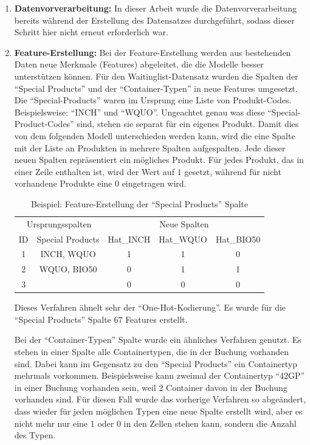 \begin{enumerate}
    \item \textbf{Datenvorverarbeitung:}  
    In dieser Arbeit wurde die Datenvorverarbeitung bereits während der Erstellung des Datensatzes durchgeführt, sodass dieser Schritt hier nicht erneut erforderlich war.

    \item \textbf{Feature-Erstellung:}  
    Bei der Feature-Erstellung werden aus bestehenden Daten neue Merkmale (Features) abgeleitet, die die Modelle besser unterstützen können. 
    Für den Waitinglist-Datensatz wurden die Spalten der \enquote{Special Products} und der \enquote{Container-Typen} in neue Features umgesetzt. Die \enquote{Special-Products} waren im Ursprung eine Liste von Produkt-Codes. Beispielsweise: \enquote{INCH} und \enquote{WQUO}. Ungeachtet genau was diese \enquote{Special-Product-Codes} sind, stehen sie separat für ein eigenes Produkt. 
    Damit dies von dem folgenden Modell unterschieden werden kann, wird die eine Spalte mit der Liste an Produkten in mehrere Spalten aufgespalten. 
    Jede dieser neuen Spalten repräsentiert ein mögliches Produkt. 
    Für jedes Produkt, das in einer Zeile enthalten ist, wird der Wert auf $1$ gesetzt, während für nicht vorhandene Produkte eine $0$ eingetragen wird.

    
    \begin{table}[H]
        \centering
        \begin{tabular}{cc|ccc}
            \hline\hline
             \multicolumn{2}{c|}{Ursprungsspalten}& \multicolumn{3}{c}{Neue Spalten}\\
             ID&  Special Products&  Hat\_INCH&  Hat\_WQUO& Hat\_BIO50\\
             \hline
             1& INCH, WQUO& 1& 1&0\\
             2& WQUO, BIO50& 0& 1&1\\
             3& & 0& 0& 0\\
            \hline\hline
        \end{tabular}
        \caption{Beispiel: Feature-Erstellung der \enquote{Special Products} Spalte}
        \label{tab:bsp_special_products}
    \end{table}

    Dieses Verfahren ähnelt sehr der \enquote{One-Hot-Kodierung}. Es wurde für die \enquote{Special Products} Spalte $67$ Features erstellt.

    Bei der \enquote{Container-Typen} Spalte wurde ein ähnliches Verfahren genutzt. 
    Es stehen in einer Spalte alle Containertypen, die in der Buchung vorhanden sind. 
    Dabei kann im Gegensatz zu den \enquote{Special Products} ein Containertyp mehrmals vorkommen. Beispielsweise kann zweimal der Containertyp \enquote{42GP} in einer Buchung vorhanden sein, weil 2 Container davon in der Buchung vorhanden sind. 
    Für diesen Fall wurde das vorherige Verfahren so abgeändert, dass wieder für jeden möglichen Typen eine neue Spalte erstellt wird, aber es nicht mehr nur eine $1$ oder $0$ in den Zellen stehen kann, sondern die Anzahl des Typen.


\end{enumerate}
